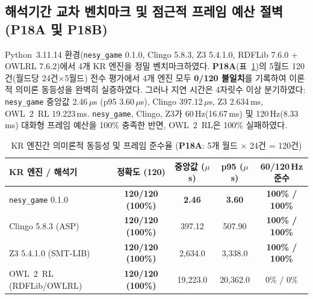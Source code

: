 \subsection{해석기간 교차 벤치마크 및 점근적 프레임 예산 절벽 (\textbf{P18A} 및 \textbf{P18B})}\label{sec:kr-benchmarks}
Python~3.11.14 환경(\texttt{nesy\_game} 0.1.0, Clingo 5.8.3, Z3 5.4.1.0, RDFLib 7.6.0 + OWLRL 7.6.2)에서 4개 KR 엔진을 정밀 벤치마크하였다. \textbf{P18A}(표~\ref{tab:p18a})의 5월드 120건(월드당 24건$\times$5월드) 전수 평가에서 4개 엔진 모두 \textbf{0/120 불일치}를 기록하여 이론적 의미론 동등성을 완벽히 실증하였다. 그러나 지연 시간은 4자릿수 이상 분기하였다: \texttt{nesy\_game} 중앙값 2.46\,$\mu$s (p95 3.60\,$\mu$s), Clingo 397.12\,$\mu$s, Z3 2.634\,ms, OWL~2~RL 19.223\,ms. \texttt{nesy\_game}, Clingo, Z3가 60\,Hz(16.67\,ms) 및 120\,Hz(8.33\,ms) 대화형 프레임 예산을 100\% 충족한 반면, OWL~2~RL은 100\% 실패하였다.

\begin{table}[!tbp]
\caption{KR 엔진간 의미론적 동등성 및 프레임 준수율 (\textbf{P18A}: 5개 월드 $\times$ 24건 = 120건)}
\label{tab:p18a}
\centering
\scriptsize
\setlength{\tabcolsep}{2.5pt}
\begin{tabularx}{\columnwidth}{@{}>{\raggedright\arraybackslash}Xcccc@{}}
\toprule
\textbf{KR 엔진 / 해석기} & \textbf{정확도 (120)} & \textbf{중앙값 ($\mu$s)} & \textbf{p95 ($\mu$s)} & \textbf{60/120\,Hz 준수} \\
\midrule
\texttt{nesy\_game} 0.1.0 & \textbf{120/120 (100\%)} & \textbf{2.46} & \textbf{3.60} & \textbf{100\% / 100\%} \\
Clingo 5.8.3 (ASP)~\cite{gebser2019clingo} & \textbf{120/120 (100\%)} & 397.12 & 507.90 & \textbf{100\% / 100\%} \\
Z3 5.4.1.0 (SMT-LIB)~\cite{demoura2008z3} & \textbf{120/120 (100\%)} & 2,634.0 & 3,338.0 & \textbf{100\% / 100\%} \\
OWL~2~RL (RDFLib/OWLRL)~\cite{motik2012owl2profiles} & \textbf{120/120 (100\%)} & 19,223.0 & 20,362.0 & 0\% / 0\% \\
\bottomrule
\end{tabularx}
\end{table}

